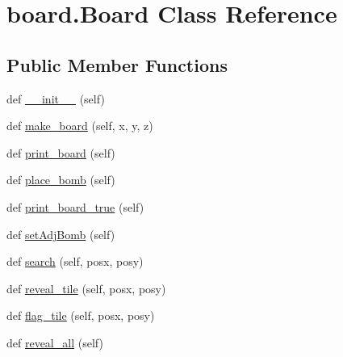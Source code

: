 \hypertarget{classboard_1_1_board}{}\section{board.\+Board Class Reference}
\label{classboard_1_1_board}
\subsection*{Public Member Functions}
\begin{DoxyCompactItemize}
\item 
def \mbox{\hyperlink{classboard_1_1_board_a35203bbf9b43a84ecfea81eb7cbe66fd}{\+\_\+\+\_\+init\+\_\+\+\_\+}} (self)
\item 
def \mbox{\hyperlink{classboard_1_1_board_ad8ae45ae3897296e325afbeb0ae8ae18}{make\+\_\+board}} (self, x, y, z)
\item 
def \mbox{\hyperlink{classboard_1_1_board_aefc9d1d94c291d150c7cc4f171156238}{print\+\_\+board}} (self)
\item 
def \mbox{\hyperlink{classboard_1_1_board_a80bb62a7dcf8e358084082ff6ea730e7}{place\+\_\+bomb}} (self)
\item 
def \mbox{\hyperlink{classboard_1_1_board_a71c3995ac93cb4f40abdb1c684b6cafd}{print\+\_\+board\+\_\+true}} (self)
\item 
def \mbox{\hyperlink{classboard_1_1_board_a2a2634ef64e8ae39381583c459c5026d}{set\+Adj\+Bomb}} (self)
\item 
def \mbox{\hyperlink{classboard_1_1_board_a420310ce5c8eb10a889a3e583783b9e9}{search}} (self, posx, posy)
\item 
def \mbox{\hyperlink{classboard_1_1_board_a2d186854c045a32d53a302e5d73d480e}{reveal\+\_\+tile}} (self, posx, posy)
\item 
def \mbox{\hyperlink{classboard_1_1_board_aabde992af88c3219259f21f4217b0d83}{flag\+\_\+tile}} (self, posx, posy)
\item 
def \mbox{\hyperlink{classboard_1_1_board_ad69981d86037be2ba3c5b8d5586d3c8e}{reveal\+\_\+all}} (self)
\end{DoxyCompactItemize}

